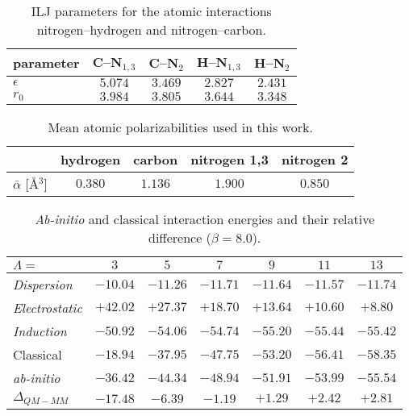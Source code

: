 \def\btab#1#2{\expandafter\gdef\csname tab-#1\endcsname{\begin{table}[ht]#2\label{#1}\end{table}}}
\def\tref#1{\csname tab-#1\endcsname\Cref{#1}}

\btab{tab:ILJ_parms}{
    \centering
    \begin{tabular}{l cccc}
        \toprule
        parameter   & C--N$_{1,3}$  & C--N$_2$  & H--N$_{1,3}$  & H--N$_2$ \\
        \midrule
        $\epsilon$  & $5.074$       & $3.469$   & $2.827$       & $2.431$  \\
        $r_0$       & $3.984$       & $3.805$   & $3.644$       & $3.348$  \\
        \bottomrule
    \end{tabular}
    \caption{ILJ parameters for the atomic interactions nitrogen--hydrogen and nitrogen--carbon.}
}

\btab{tab:polarizabilities}{
    \centering
    \begin{tabular}{l cccc}
        \toprule
        ~                        & hydrogen & carbon  & nitrogen 1,3 & nitrogen 2 \\
        \midrule
        $\bar{\alpha}$ [\AA$^3$] & $0.380$  & $1.136$ & $1.900$      & $0.850$    \\
        \bottomrule
    \end{tabular}
    \caption{Mean atomic polarizabilities used in this work.}
}

\btab{tab:pot_comp}{
    \centering
    \begin{tabular}{l cccccc}
        \toprule
        $\Lambda =$            & $3$      & $5$      & $7$      & $9$      & $11$     & $13$     \\
        \midrule
        \textit{Dispersion}    & $-10.04$ & $-11.26$ & $-11.71$ & $-11.64$ & $-11.57$ & $-11.74$ \\
        \textit{Electrostatic} & $+42.02$ & $+27.37$ & $+18.70$ & $+13.64$ & $+10.60$ & $+8.80 $ \\
        \textit{Induction}     & $-50.92$ & $-54.06$ & $-54.74$ & $-55.20$ & $-55.44$ & $-55.42$ \\
        \midrule
        Classical              & $-18.94$ & $-37.95$ & $-47.75$ & $-53.20$ & $-56.41$ & $-58.35$ \\
        \emph{ab-initio}       & $-36.42$ & $-44.34$ & $-48.94$ & $-51.91$ & $-53.99$ & $-55.54$ \\
        \midrule
        $\Delta_{QM-MM}$       & $-17.48$ & $-6.39$  & $-1.19$  & $+1.29$  & $+2.42$  & $+2.81 $ \\
        \bottomrule
    \end{tabular}
    \caption{\emph{Ab-initio} and classical interaction energies and their relative difference ($\beta = 8.0$).}
}

